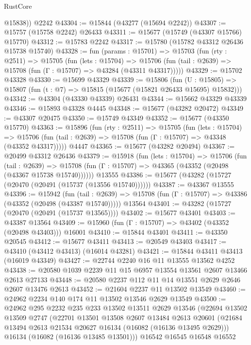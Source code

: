 \begin{lexlean}{RustCore}
\begin{coremodule}
        @15838))
    @2242
@43304 := @15844 (@43277 (@15694 @2242))
@43307 := @15757 (@15758 @2242) @26433
@43311 := @15677 (@15749 (@43307 @15766) @15770)
@43312 := @15783 @2242
@43317 := @15780 (@15782 @43312 @26436 @15738 @15740)
@43328 := fun (params : @15701) =>
  @15703
    (fun (rty : @2511) =>
    @15705
      (fun (lets : @15704) =>
      @15706 (fun (tail : @2639) => @15708 (fun (Γ : @15707) => @43284 (@43311 @43317)))))
@43329 := @15702 @43328
@43330 := @15699 @43329
@43339 := @15806
    (fun (U : @15805) => @15807 (fun (t : @7) => @15815 (@15677 (@15821 @26433 @15695) @15832)))
@43342 := @43304 (@43330 @43339) @26431
@43344 := @15662 @43329 @43339
@43346 := @15893 @43328 @4445
@43348 := @15677 (@43282 @20472)
@43349 := @43307 @20475
@43350 := @15749 @43349
@43352 := @15677 (@43350 @15770)
@43363 := @15896
    (fun (rty : @2511) =>
    @15705
      (fun (lets : @15704) =>
      @15706 (fun (tail : @2639) => @15708 (fun (Γ : @15707) => @43348 (@43352 @43317)))))
    @4447
@43365 := @15677 (@43282 @20494)
@43367 := @20499 @43312 @26436
@43379 := @15918
    (fun (lets : @15704) =>
    @15706
      (fun (tail : @2639) =>
      @15708 (fun (Γ : @15707) => @43365 (@43352 (@20498 (@43367 @15738 @15740))))))
    @13555
@43386 := @15677 (@43282 (@15727 (@20470 (@20491 (@15737 (@13556 @15740))))))
@43387 := @43367 @13555
@43396 := @15942
    (fun (tail : @2639) => @15708 (fun (Γ : @15707) => @43386 (@43352 (@20498 (@43387 @15740)))))
    @13564
@43401 := @43282 (@15727 (@20470 (@20491 (@15737 @13565))))
@43402 := @15677 @43401
@43403 := @43387 @13564
@43409 := @15960 (fun (Γ : @15707) => @43402 (@43352 (@20498 @43403))) @16001
@43410 := @15844 @43401
@43411 := @43350 @20545
@43412 := @15677 @43411
@43413 := @20549 @43403
@43417 := @43410 (@43412 @43413) (@16014 @43281)
@43421 := @15844 @43411 @43413 (@16019 @43349)
@43427 := @22744 @2240 @16 @11 @13555 @13562 @4252
@43438 := @20580 @1039 @2239 @11 @15 @6957 @13554 @13561 @2607 @13466 @2613 @27133
@43448 := @20580 @2237 @112 @11 @14 @13551 @2629 @2646 @2607 @13476 @2613
@43452 := @21604 @2237 @11 @13502 @13549
@43460 := @24962 @2234 @140 @174 @11 @13502 @13546 @2629 @13549
@43500 := @24962
    @295
    @2232
    @235
    @233
    @13502
    @13511
    @2629
    @13546
    (@22694
      @13502
      @13509
      @2747
      (@22701
        @13501
        @13508
        @2607
        @13484
        @2613
        @20601
        (@21684 @13494 @2613 @21534 @20627 @16134 (@16082 (@16136 @13495 @2629)))
        @16134
        (@16082 (@16136 @13485 @13501)))
      @16542
      @16545
      @16548
      @16552

\end{coremodule}
\end{lexlean}
